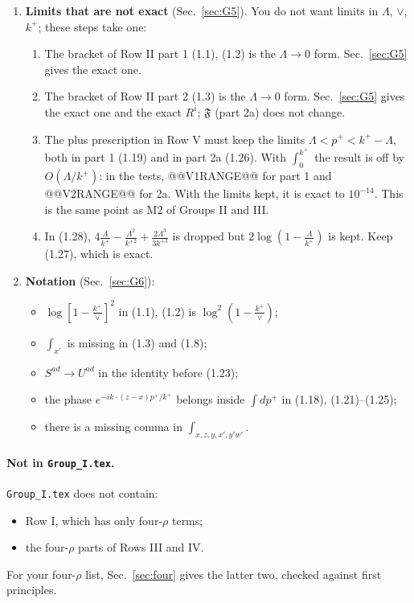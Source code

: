 \documentclass[10pt]{article}
\numberwithin{equation}{section}
\begin{document}
\begin{enumerate}
\begin{itemize}
\item The integrand has a pole at $p^+_*=k^+(x-w)^2/(x-z)^2$. When $p^+_*$ lies in the integration range, the argument of the logarithm is negative; the principal value then gives the modulus. Your Fourier transforms (i3)--(i5) are principal values too.
\end{itemize}
\item[\textbf{G5}] \textbf{Limits that are not exact} (Sec.~\ref{sec:G5}). You do not want limits in $\Lambda$, $\vee$, $k^+$; these steps take one:
\begin{enumerate}
\item The bracket of Row II part 1 (1.1), (1.2) is the $\Lambda\to0$ form. Sec.~\ref{sec:G5} gives the exact one.
\item The bracket of Row II part 2 (1.3) is the $\Lambda\to0$ form. Sec.~\ref{sec:G5} gives the exact one and the exact $R^i$; $\mathfrak F$ (part 2a) does not change.
\item The plus prescription in Row V must keep the limits $\Lambda<p^+<k^+-\Lambda$, both in part 1 (1.19) and in part 2a (1.26). With $\int_0^{k^+}$ the result is off by $O(\Lambda/k^+)$: in the tests, @@V1RANGE@@ for part 1 and @@V2RANGE@@ for 2a. With the limits kept, it is exact to $10^{-14}$. This is the same point as M2 of Groups II and III.
\item In (1.28), $4\frac{\Lambda}{k^+}-\frac{\Lambda^2}{k^{+2}}+\frac{2\Lambda^3}{3k^{+3}}$ is dropped but $2\log(1-\frac{\Lambda}{k^+})$ is kept. Keep (1.27), which is exact.
\end{enumerate}
\item[\textbf{G6}] \textbf{Notation} (Sec.~\ref{sec:G6}):
\begin{itemize}
\item $\log[1-\frac{k^+}{\vee}]^2$ in (1.1), (1.2) is $\log^2(1-\frac{k^+}{\vee})$;
\item $\int_{x'}$ is missing in (1.3) and (1.8);
\item $S^{ad}\to U^{ad}$ in the identity before (1.23);
\item the phase $e^{-ik\cdot(z-x)p^+/k^+}$ belongs inside $\int dp^+$ in (1.18), (1.21)--(1.25);
\item there is a missing comma in $\int_{x,z,y,x',y'w'}$.
\end{itemize}
\end{enumerate}
\paragraph{Not in \texttt{Group\_I.tex}.} \texttt{Group\_I.tex} does not contain:
\begin{itemize}
\item Row I, which has only four-$\rho$ terms;
\item the four-$\rho$ parts of Rows III and IV.
\end{itemize}
For your four-$\rho$ list, Sec.~\ref{sec:four} gives the latter two, checked against first principles.
\end{document}
